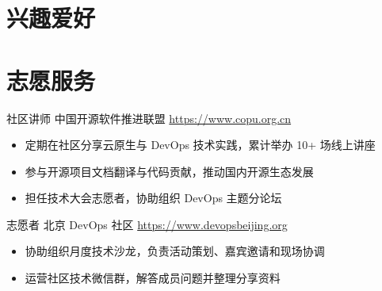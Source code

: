 \documentclass[a4paper, serif, 10pt]{moderncv}
\begin{document}
\section{兴趣爱好}

\section{志愿服务}

        {社区讲师}
        {中国开源软件推进联盟}
        {\url{https://www.copu.org.cn}}
        {}
        {\begin{itemize}
\item 定期在社区分享云原生与 DevOps 技术实践，累计举办 10+ 场线上讲座
\item 参与开源项目文档翻译与代码贡献，推动国内开源生态发展
\item 担任技术大会志愿者，协助组织 DevOps 主题分论坛
\end{itemize}}
    

        {志愿者}
        {北京 DevOps 社区}
        {\url{https://www.devopsbeijing.org}}
        {}
        {\begin{itemize}
\item 协助组织月度技术沙龙，负责活动策划、嘉宾邀请和现场协调
\item 运营社区技术微信群，解答成员问题并整理分享资料
\end{itemize}}
    
\end{document}
